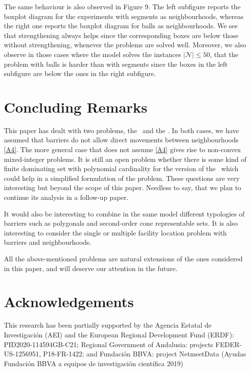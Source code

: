 \documentclass[a4paper,  review, authoryear, 1p.]{elsarticle}
\newcommand{\SPPN}{{\sf{H-SPPN}\xspace }}
\newcommand{\TSPN}{{\sf{H-TSPN}\xspace }}
\begin{document}
	The same behaviour is also observed in Figure 9. The left subfigure reports the boxplot diagram for the experiments with segments as neighbourhoods, whereas the right one reports the boxplot diagram for balls as neighbourhoods. We see that strengthening always helps since the corresponding boxes are below those without strengthening, whenever the problems are solved well. Moreover,  we also observe in those cases where the model solves the instances  $|\mathcal{N}|\le 50$, that the problem with balls is harder than with segments since the boxes in the left subfigure are below the ones in the right subfigure.
	
	
	
	
	
	
	
	
	\section{Concluding Remarks}
	
	This paper has dealt with two problems, the \SPPN \ and the \TSPN. In both cases, we have assumed that barriers do not allow direct movements between neighbourhoods \ref{A4}. The more general case that does not assume \ref{A4} gives rise to non-convex mixed-integer problems. It is still an open problem whether there is some kind of finite dominating set with polynomial cardinality for the version of the \TSPN \ which could help in a simplified formulation of the problem. These questions are very interesting but beyond the scope of this paper. Needless to say, that we plan to continue its analysis in a follow-up paper.
	
	
	It would also be interesting to combine in the same model different typologies of barriers such as polygonals and second-order cone representable sets. It is also interesting to consider the single or multiple facility location problem with barriers and neighbourhoods. 
	
	All the above-mentioned problems are natural extensions of the ones considered in this paper, and  will deserve our attention in the future.
	
	\section*{Acknowledgements}
	This research has been partially supported by the Agencia Estatal de Investigación (AEI) and the European Regional Development Fund (ERDF): PID2020-114594GB-C21; Regional Government of Andalusia: projects FEDER-US-1256951, P18-FR-1422;  and Fundación BBVA: project NetmeetData (Ayudas
	Fundación BBVA a equipos de investigación científica 2019)
	
	
	
	
	
\end{document}
